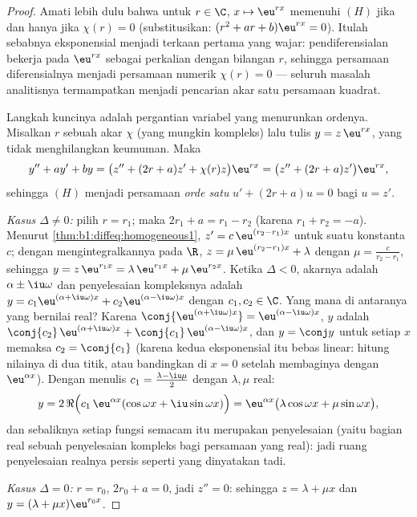 \begin{proof}
Amati lebih dulu bahwa untuk $r \in \C$, $x \mapsto \eu^{rx}$ memenuhi $(H)$
jika dan hanya jika $\chi(r) = 0$ (substitusikan: $(r^2 + ar + b)\eu^{rx} =
0$). Itulah sebabnya eksponensial menjadi terkaan pertama yang wajar:
pendiferensialan bekerja pada $\eu^{rx}$ sebagai perkalian dengan bilangan
$r$, sehingga persamaan diferensialnya menjadi persamaan numerik
$\chi(r) = 0$ --- seluruh masalah analitisnya termampatkan menjadi
pencarian akar satu persamaan kuadrat.

Langkah kuncinya adalah pergantian variabel yang menurunkan ordenya. Misalkan $r$
sebuah akar $\chi$ (yang mungkin kompleks) lalu tulis $y = z\, \eu^{rx}$,
yang tidak menghilangkan keumuman. Maka
\[
y'' + ay' + by
= \bigl(z'' + (2r + a) z' + \chi(r) z\bigr)\eu^{rx}
= \bigl(z'' + (2r + a) z'\bigr)\eu^{rx},
\]
sehingga $(H)$ menjadi persamaan \emph{orde satu} $u' + (2r + a) u = 0$
bagi $u = z'$.

\emph{Kasus $\Delta \neq 0$:} pilih $r = r_1$; maka $2r_1 + a = r_1 -
r_2$ (karena $r_1 + r_2 = -a$). Menurut
\cref{thm:b1:diffeq:homogeneous1}, $z' = c\,\eu^{(r_2 - r_1)x}$ untuk
suatu konstanta $c$; dengan mengintegralkannya pada $\R$, $z = \mu\, \eu^{(r_2 - r_1)x}
+ \lambda$ dengan $\mu = \frac{c}{r_2 - r_1}$, sehingga $y = z\,
\eu^{r_1 x} = \lambda\,\eu^{r_1x} + \mu\,\eu^{r_2x}$.
Ketika $\Delta < 0$, akarnya adalah $\alpha \pm \iu\omega$ dan
penyelesaian kompleksnya adalah $y = c_1\eu^{(\alpha+\iu\omega)x} +
c_2\eu^{(\alpha-\iu\omega)x}$ dengan $c_1, c_2 \in \C$. Yang mana di antaranya
yang bernilai real? Karena $\conj{\eu^{(\alpha+\iu\omega)x}} =
\eu^{(\alpha-\iu\omega)x}$,  $y$ adalah $\conj{c_2}\,
\eu^{(\alpha+\iu\omega)x} + \conj{c_1}\,\eu^{(\alpha-\iu\omega)x}$,
dan $y = \conj y$ untuk setiap $x$ memaksa $c_2 = \conj{c_1}$ (karena kedua
eksponensial itu bebas linear: hitung nilainya di dua titik, atau
bandingkan di $x=0$ setelah membaginya dengan $\eu^{\alpha x}$). Dengan menulis $c_1
= \frac{\lambda - \iu\mu}2$ dengan $\lambda, \mu$ real:
\[
y = 2\,\Re\Bigl(c_1\,\eu^{\alpha x}(\cos\omega x +
\iu\sin\omega x)\Bigr)
= \eu^{\alpha x}\bigl(\lambda\cos\omega x + \mu\sin\omega
x\bigr),
\]
dan sebaliknya setiap fungsi semacam itu merupakan penyelesaian (yaitu bagian real
sebuah penyelesaian kompleks bagi persamaan yang real): jadi ruang penyelesaian realnya
persis seperti yang dinyatakan tadi.

\emph{Kasus $\Delta = 0$:} $r = r_0$, $2r_0 + a = 0$, jadi $z'' = 0$:
sehingga $z = \lambda + \mu x$ dan $y = (\lambda + \mu x)\eu^{r_0 x}$.
\end{proof}

